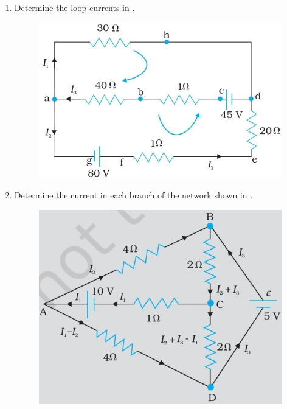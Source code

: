 \begin{enumerate}[label=\thesubsection.\arabic*.,ref=\thesubsection.\theenumi]
	\item Determine the loop currents in 
    . 
		\begin{figure}[H] 
    \centering
    \includegraphics[width=\columnwidth]{figs/ckts/ckt1.jpg} %
    \caption{} 
    \label{fig:ckt1} 
\end{figure}
	\item Determine the current in each branch of the network shown in 
    . 
		\begin{figure}[H] 
    \centering
    \includegraphics[width=\columnwidth]{figs/ckts/ckt2.jpg} %
    \caption{} 
    \label{fig:ckt2} 

\end{figure}
\end{enumerate}
